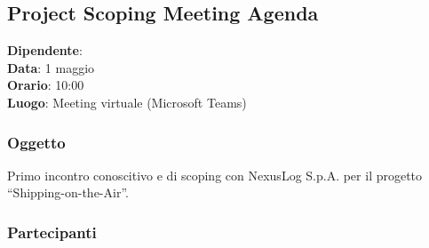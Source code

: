 \documentclass[12pt, a4paper]{article}
\begin{document}
\subsection*{Project Scoping Meeting Agenda}

\noindent
\textbf{Dipendente}: \\
\textbf{Data}: 1 maggio \\
\textbf{Orario}: 10:00 \\
\textbf{Luogo}: Meeting virtuale (Microsoft Teams)

\subsubsection*{Oggetto}
Primo incontro conoscitivo e di scoping con NexusLog S.p.A. per il progetto ``Shipping-on-the-Air''.

\subsubsection*{Partecipanti}
\vspace{1.5cm}
\end{document}
